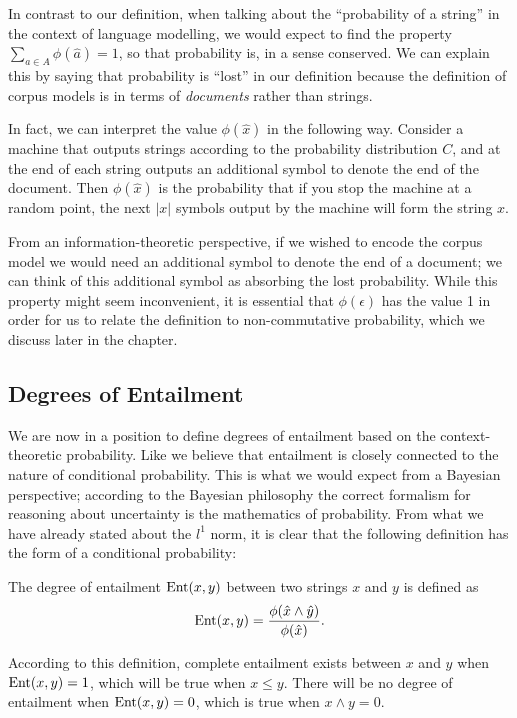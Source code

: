 \documentclass[11pt]{report}
\begin{document}
In contrast to our definition, when talking about the ``probability of a string'' in the context of language modelling, we would expect to find the property $\sum_{a \in A} \phi(\hat{a}) = 1$, so that probability is, in a sense conserved. We can explain this by saying that probability is ``lost'' in our definition because the definition of corpus models is in terms of \emph{documents} rather than strings. 

In fact, we can interpret the value $\phi(\hat{x})$ in the following way. Consider a machine that outputs strings according to the probability distribution $C$, and at the end of each string outputs an additional symbol to denote the end of the document. Then $\phi(\hat{x})$ is the probability that if you stop the machine at a random point, the next $|x|$ symbols output by the machine will form the string $x$.

From an information-theoretic perspective, if we wished to encode the corpus model we would need an additional symbol to denote the end of a document; we can think of this additional symbol as absorbing the lost probability. While this property might seem inconvenient, it is essential that $\phi(\epsilon)$ has the value 1 in order for us to relate the definition to non-commutative probability, which we discuss later in the chapter.


\subsection{Degrees of Entailment}

We are now in a position to define degrees of entailment based on the context-theoretic probability. Like \cite{Glickman:05} we believe that entailment is closely connected to the nature of conditional probability. This is what we would expect from a Bayesian perspective; according to the Bayesian philosophy the correct formalism for reasoning about uncertainty is the mathematics of probability. From what we have already stated about the $l^1$ norm, it is clear that the following definition has the form of a conditional probability:
\begin{defn}
The degree of entailment $\operatorname{Ent}(x,y)$ between two strings $x$ and $y$ is defined as
$$\operatorname{Ent}(x,y) = \frac{\phi(\hat{x}\land\hat{y})}{\phi(\hat{x})}.$$
\end{defn}
According to this definition, complete entailment exists between $x$ and $y$ when $\operatorname{Ent}(x,y) = 1$, which will be true when $x \le y$. There will be no degree of entailment when $\operatorname{Ent}(x,y) = 0$, which is true when $x \land y = 0$.
\end{document}

